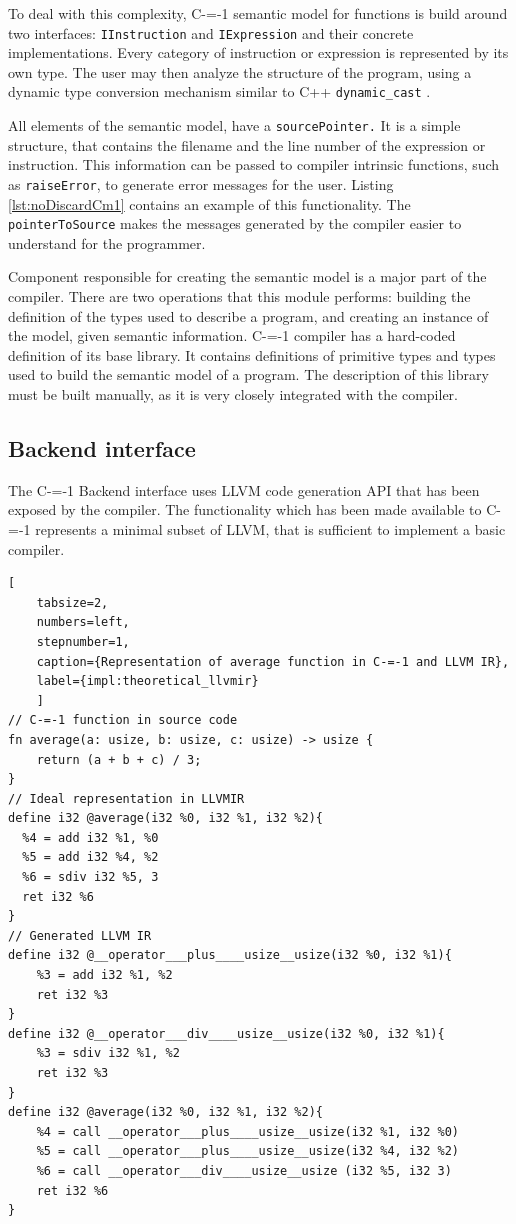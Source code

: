 To deal with this complexity, C-=-1 semantic model for functions is build around two interfaces: \lstinline{IInstruction} and \lstinline{IExpression} and their concrete implementations.
Every category of instruction or expression is represented by its own type.
The user may then analyze the structure of the program, using a dynamic type conversion mechanism similar to C++ \lstinline{dynamic_cast} \cite{ISO:cpp98}.

All elements of the semantic model, have a \lstinline{sourcePointer.}
It is a simple structure, that contains the filename and the line number of the expression or instruction.
This information can be passed to compiler intrinsic functions, such as \lstinline{raiseError}, to generate error messages for the user.
Listing \ref{lst:noDiscardCm1} contains an example of this functionality.
The \lstinline{pointerToSource} makes the messages generated by the compiler easier to understand for the programmer.

Component responsible for creating the semantic model is a major part of the compiler.
There are two operations that this module performs: building the definition of the types used to describe a program, and creating an instance of the model, given semantic information.
C-=-1 compiler has a hard-coded definition of its base library.
It contains definitions of primitive types and types used to build the semantic model of a program.
The description of this library must be built manually, as it is very closely integrated with the compiler.

\subsection{Backend interface}
\label{implementation/Backend-interface}

The C-=-1 Backend interface uses LLVM \cite{llvmir} code generation API that has been exposed by the compiler.
The functionality which has been made available to C-=-1 represents a minimal subset of LLVM, that is sufficient to implement a basic compiler.


\begin{minipage}{\linewidth}
	\begin{lstlisting}[
	tabsize=2,
	numbers=left,
	stepnumber=1,
	caption={Representation of average function in C-=-1 and LLVM IR},
	label={impl:theoretical_llvmir}
	]
// C-=-1 function in source code
fn average(a: usize, b: usize, c: usize) -> usize {
	return (a + b + c) / 3;
}
// Ideal representation in LLVMIR
define i32 @average(i32 %0, i32 %1, i32 %2){
  %4 = add i32 %1, %0
  %5 = add i32 %4, %2
  %6 = sdiv i32 %5, 3
  ret i32 %6
}
// Generated LLVM IR
define i32 @__operator___plus____usize__usize(i32 %0, i32 %1){
	%3 = add i32 %1, %2
	ret i32 %3
}
define i32 @__operator___div____usize__usize(i32 %0, i32 %1){
	%3 = sdiv i32 %1, %2
	ret i32 %3
}
define i32 @average(i32 %0, i32 %1, i32 %2){
	%4 = call __operator___plus____usize__usize(i32 %1, i32 %0)
	%5 = call __operator___plus____usize__usize(i32 %4, i32 %2)
	%6 = call __operator___div____usize__usize (i32 %5, i32 3)
	ret i32 %6
}
\end{lstlisting}
\end{minipage}


